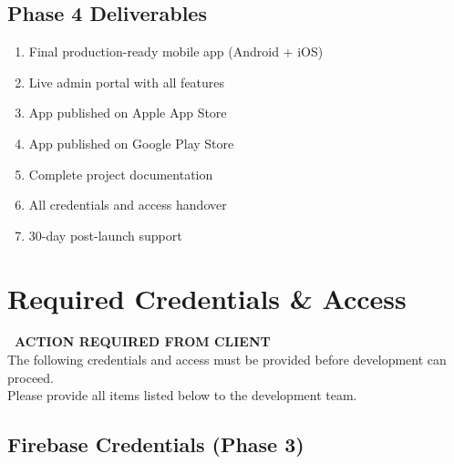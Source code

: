 \documentclass[11pt,a4paper]{article}
\begin{document}
\subsection{Phase 4 Deliverables}

\begin{enumerate}[label=\textbf{\arabic*.}]
\item Final production-ready mobile app (Android + iOS)
\item Live admin portal with all features
\item App published on Apple App Store
\item App published on Google Play Store
\item Complete project documentation
\item All credentials and access handover
\item 30-day post-launch support
\end{enumerate}


\newpage
\section{Required Credentials \& Access}

\begin{center}
\colorbox{critical!20}{\parbox{0.9\textwidth}{
\centering
\textbf{\large \faExclamationTriangle\ ACTION REQUIRED FROM CLIENT}\\[0.3cm]
The following credentials and access must be provided before development can proceed.\\
Please provide all items listed below to the development team.
}}
\end{center}

\vspace{0.5cm}

\subsection{Firebase Credentials (Phase 3)}
\end{document}
